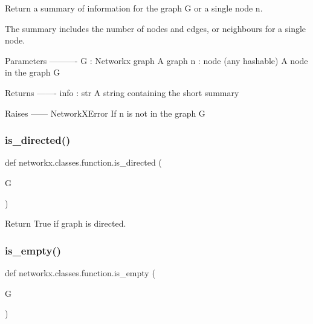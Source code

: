\begin{DoxyVerb}Return a summary of information for the graph G or a single node n.

The summary includes the number of nodes and edges, or neighbours for a single
node.

Parameters
----------
G : Networkx graph
   A graph
n : node (any hashable)
   A node in the graph G

Returns
-------
info : str
    A string containing the short summary

Raises
------
NetworkXError
    If n is not in the graph G\end{DoxyVerb}
 \mbox{\label{namespacenetworkx_1_1classes_1_1function_a4a5dbd375698725a35a7d3fd4493ba7c}} 
\subsubsection{\texorpdfstring{is\+\_\+directed()}{is\_directed()}}
{\footnotesize\ttfamily def networkx.\+classes.\+function.\+is\+\_\+directed (\begin{DoxyParamCaption}\item[{}]{G }\end{DoxyParamCaption})}

\begin{DoxyVerb}Return True if graph is directed.\end{DoxyVerb}
 \mbox{\label{namespacenetworkx_1_1classes_1_1function_aa66588440e17cb5cbad23b903d9c682e}} 
\subsubsection{\texorpdfstring{is\+\_\+empty()}{is\_empty()}}
{\footnotesize\ttfamily def networkx.\+classes.\+function.\+is\+\_\+empty (\begin{DoxyParamCaption}\item[{}]{G }\end{DoxyParamCaption})}

